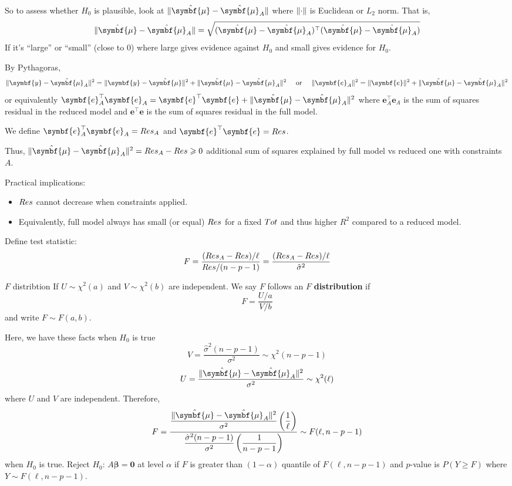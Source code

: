 So to assess whether $ H_0 $ is plausible,
look at $ \norm{\hat{\symbf{\mu}}-\hat{\symbf{\mu}}_A} $
where $ \lVert\cdot\rVert $ is Euclidean or $ L_2 $ norm. That is,
\[ \norm{\hat{\symbf{\mu}}-\hat{\symbf{\mu}}_A}=
    \sqrt{(\hat{\symbf{\mu}}-\hat{\symbf{\mu}}_A)^\top(\hat{\symbf{\mu}}-\hat{\symbf{\mu}}_A)} \]
If it's ``large'' or ``small'' (close to 0)
where large gives evidence against $ H_0 $
and small gives evidence for $ H_0 $.

By Pythagoras,
\[ \norm{\symbf{y}-\hat{\symbf{\mu}}_A}^2=
    \norm{\symbf{y}-\hat{\symbf{\mu}}}^2+
    \norm{\hat{\symbf{\mu}}-\hat{\symbf{\mu}}_A}^2
    \quad\text{ or }\quad
    \norm{\symbf{e}_A}^2=\norm{\symbf{e}}^2+\norm{\hat{\symbf{\mu}}-
        \hat{\symbf{\mu}}_A
    }^2 \]
or equivalently $ \symbf{e}_A^\top \symbf{e}_A=\symbf{e}^\top \symbf{e}
    +\norm{\hat{\symbf{\mu}}-
        \hat{\symbf{\mu}}_A
    }^2 $
where $ \symbf{e}_A^\top \symbf{e}_A $ is the sum of squares
residual in the reduced model and $ \symbf{e}^\top \symbf{e} $
is the sum of squares residual in the full model.

We define $ \symbf{e}_A^\top \symbf{e}_A=\SS{Res}_A $
and $ \symbf{e}^\top \symbf{e} =\SS{Res} $.

Thus, $ \norm{\hat{\symbf{\mu}}-\hat{\symbf{\mu}}_A}^2=
    \SS{Res}_A-\SS{Res} \geqslant 0 $
additional sum of squares explained by full model vs reduced
one with constraints $ A $.

Practical implications:
\begin{itemize}
    \item $ \relax{Res} $ cannot decrease when constraints applied.
    \item Equivalently, full model always has small (or equal)
          $ \relax{Res} $ for a fixed $ \relax{Tot} $
          and thus higher $ R^2 $ compared to a reduced model.
\end{itemize}

Define test statistic:
\[ F=\frac{(\relax{Res}_A-\relax{Res})/\ell}{\relax{Res}/(n-p-1)}=
    \frac{(\relax{Res}_A-\relax{Res})/\ell}{\hat{\sigma}^2}  \]
\begin{Definition}{$F$ distribtion}{}
    If $ U \sim \chi^2(a) $ and $ V \sim \chi^2(b) $
    are independent. We say $ F $ follows an
    $ F $ \textbf{distribution} if
    \[ F=\frac{U/a}{V/b} \]
    and write $ F \sim F(a,b) $.
\end{Definition}
Here, we have these facts when $ H_0 $ is true
\[ V=\frac{\hat{\sigma}^2(n-p-1)}{\sigma^2}\sim \chi^2(n-p-1)  \]
\[ U=\frac{\norm{\hat{\symbf{\mu}}-\hat{\symbf{\mu}}_A}^2}{\sigma^2}\sim \chi^2(\ell)  \]
where $ U $ and $ V $ are independent. Therefore,
\[ F=\dfrac{\dfrac{\norm{\hat{\symbf{\mu}}-\hat{\symbf{\mu}}_A}^2}{\sigma^2}
        \left( \dfrac{1}{\ell} \right)}{\dfrac{\hat{\sigma}^2(n-p-1)}{\sigma^2}
        \left( \dfrac{1}{n-p-1} \right)} \sim F(\ell,n-p-1)   \]
when $ H_0 $ is true. Reject
$ H_0 $: $ A\symbf{\beta}=\symbf{0} $ at level $ \alpha $
if $ F $ is greater than $ (1-\alpha) $
quantile of $ F(\ell,n-p-1) $
and $ p $-value is $ P(Y\geqslant F) $ where $ Y \sim F(\ell,n-p-1) $.


